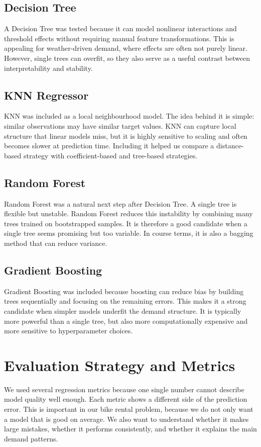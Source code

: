\documentclass[conference]{IEEEtran}
\begin{document}
\subsection{Decision Tree}
A Decision Tree was tested because it can model nonlinear interactions and threshold effects without 
requiring manual feature transformations. This is appealing for weather-driven demand, where effects 
are often not purely linear. However, single trees can overfit, so they also serve as a useful 
contrast between interpretability and stability.

\subsection{KNN Regressor}
KNN was included as a local neighbourhood model. The idea behind it is simple: similar observations 
may have similar target values. KNN can capture local structure that linear models miss, but it is 
highly sensitive to scaling and often becomes slower at prediction time. Including it helped us 
compare a distance-based strategy with coefficient-based and tree-based strategies.

\subsection{Random Forest}
Random Forest was a natural next step after Decision Tree. A single tree is flexible but unstable. 
Random Forest reduces this instability by combining many trees trained on bootstrapped samples. It is 
therefore a good candidate when a single tree seems promising but too variable. In course terms, it is 
also a bagging method that can reduce variance.

\subsection{Gradient Boosting}
Gradient Boosting was included because boosting can reduce bias by building trees sequentially and 
focusing on the remaining errors. This makes it a strong candidate when simpler models underfit the 
demand structure. It is typically more powerful than a single tree, but also more computationally 
expensive and more sensitive to hyperparameter choices.

\section{Evaluation Strategy and Metrics}
We used several regression metrics because one single number cannot describe model quality well enough. 
Each metric shows a different side of the prediction error. This is important in our bike rental problem, 
because we do not only want a model that is good on average. We also want to understand whether it makes 
large mistakes, whether it performs consistently, and whether it explains the main demand patterns.
\end{document}
